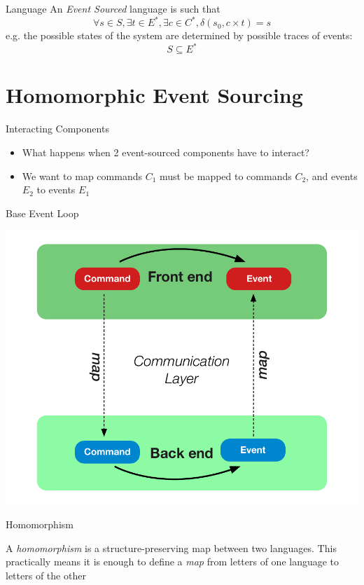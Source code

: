 \begin{frame}[fragile]{Language}
  An \emph{Event Sourced} language is such that
  $$\forall s \in S, \exists t \in E^*, \exists c \in C^*, \delta(s_0,c \times t) = s $$
  e.g. the possible states of the system are determined by possible traces of events:
  $$S \subseteq E^*$$
\end{frame}

\part{Homomorphic Event Sourcing}

\begin{frame}[fragile]{Interacting Components}
  \begin{itemize}
  \item What happens when 2 event-sourced components have to interact?
  \item We want to map commands $C_1$ must be mapped to commands $C_2$, and events $E_2$ to events $E_1$
  \end{itemize}
\end{frame}

\begin{frame}[fragile]{Base Event Loop}
\begin{center}
\includegraphics[height=.8\textheight]{./images/interaction-loop.pdf}
\end{center}
\end{frame}

\begin{frame}[fragile]{Homomorphism}

  A \emph{homomorphism} is a structure-preserving map between two languages. This practically means it is enough to
  define a \emph{map} from letters of one language to letters of the other

\end{frame}

